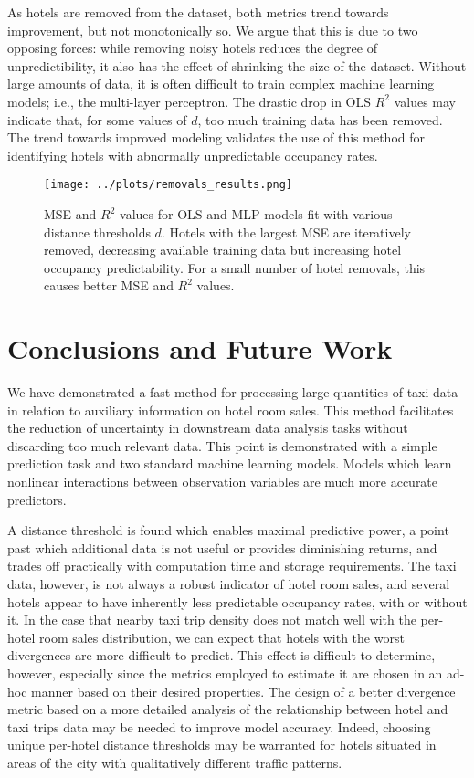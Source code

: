 \documentclass[useAMS, usenatbib]{biom}
\begin{document}
As hotels are removed from the dataset, both metrics trend towards improvement, but not monotonically so. We argue that this is due to two opposing forces: while removing noisy hotels reduces the degree of unpredictibility, it also has the effect of shrinking the size of the dataset. Without large amounts of data, it is often difficult to train complex machine learning models; i.e., the multi-layer perceptron. The drastic drop in OLS $R^2$ values may indicate that, for some values of $d$, too much training data has been removed. The trend towards improved modeling validates the use of this method for identifying hotels with abnormally unpredictable occupancy rates.

\begin{figure}
	\centering
    \captionsetup{justification=centering}
	\texttt{[image: ../plots/removals\_results.png]}
	\caption{MSE and $R^2$ values for OLS and MLP models fit with various distance thresholds $d$. Hotels with the largest MSE are iteratively removed, decreasing available training data but increasing hotel occupancy predictability. For a small number of hotel removals, this causes better MSE and $R^2$ values.}
	\label{fig:removals}
\end{figure}

\section{Conclusions and Future Work}
\label{s:conclusion}

We have demonstrated a fast method for processing large quantities of taxi data in relation to auxiliary information on hotel room sales. This method facilitates the reduction of uncertainty in downstream data analysis tasks without discarding too much relevant data. This point is demonstrated with a simple prediction task and two standard machine learning models. Models which learn nonlinear interactions between observation variables are much more accurate predictors.

A distance threshold is found which enables maximal predictive power, a point past which additional data is not useful or provides diminishing returns, and trades off practically with computation time and storage requirements. The taxi data, however, is not always a robust indicator of hotel room sales, and several hotels appear to have inherently less predictable occupancy rates, with or without it. In the case that nearby taxi trip density does not match well with the per-hotel room sales distribution, we can expect that hotels with the worst divergences are more difficult to predict. This effect is difficult to determine, however, especially since the metrics employed to estimate it are chosen in an ad-hoc manner based on their desired properties. The design of a better divergence metric based on a more detailed analysis of the relationship between hotel and taxi trips data may be needed to improve model accuracy. Indeed, choosing unique per-hotel distance thresholds may be warranted for hotels situated in areas of the city with qualitatively different traffic patterns.
\end{document}
